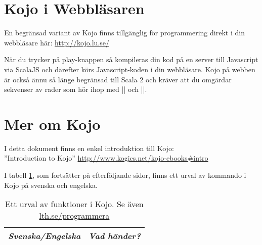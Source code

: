 \section{Kojo i Webbläsaren}

En begränsad variant av Kojo finns tillgänglig för programmering direkt i din webbläsare här: \url{http://kojo.lu.se/}

När du trycker på play-knappen så kompileras din kod på en server till Javascript via ScalaJS och därefter körs Javascript-koden i din webbläsare. 
Kojo på webben är också ännu så länge begränsad till Scala 2 och kräver att du omgärdar sekvenser av rader som hör ihop med \code|{| och \code|}|.


\section{Mer om Kojo}

I detta dokument finns en enkel introduktion till Kojo: \\ ''Introduction to Kojo'' \url{http://www.kogics.net/kojo-ebooks#intro}

\noindent I tabell \ref{table:kojo:functions}, som fortsätter på efterföljande sidor, finns ett urval av kommando i Kojo på svenska och engelska.

{\small\renewcommand{\arraystretch}{1.4}
\begin{longtable}{@{}p{} p{}}

\caption{Ett urval av funktioner i Kojo. Se även \href{http://lth.se/programmera}{lth.se/programmera}}\label{table:kojo:functions}\\

\emph{Svenska/Engelska} & \emph{Vad händer?}  \\ \hline

\end{longtable}
}%
